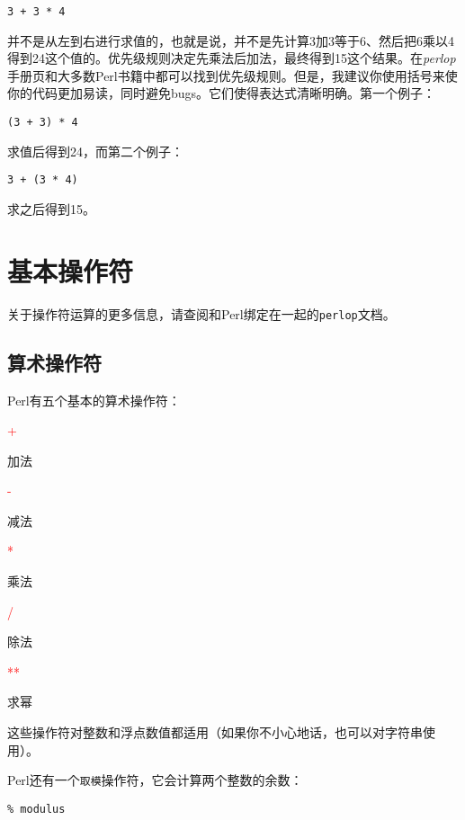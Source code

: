 \begin{lstlisting}
3 + 3 * 4
\end{lstlisting}

并不是从左到右进行求值的，也就是说，并不是先计算3加3等于6、然后把6乘以4得到24这个值的。优先级规则决定先乘法后加法，最终得到15这个结果。在\textit{perlop}手册页和大多数Perl书籍中都可以找到优先级规则。但是，我建议你使用括号来使你的代码更加易读，同时避免bugs。它们使得表达式清晰明确。第一个例子：

\begin{lstlisting}
(3 + 3) * 4
\end{lstlisting}

求值后得到24，而第二个例子：

\begin{lstlisting}
3 + (3 * 4)
\end{lstlisting}

求之后得到15。

\section{基本操作符}
关于操作符运算的更多信息，请查阅和Perl绑定在一起的\verb|perlop|文档。

\subsection{算术操作符}
Perl有五个基本的算术操作符：

\noindent
\textcolor{red}{+}
\begin{adjustwidth}{4em}{}
加法
\end{adjustwidth}
\textcolor{red}{-}
\begin{adjustwidth}{4em}{}
减法
\end{adjustwidth}
\textcolor{red}{*}
\begin{adjustwidth}{4em}{}
乘法
\end{adjustwidth}
\textcolor{red}{/}
\begin{adjustwidth}{4em}{}
除法
\end{adjustwidth}
\textcolor{red}{**}
\begin{adjustwidth}{4em}{}
求幂
\end{adjustwidth}

这些操作符对整数和浮点数值都适用（如果你不小心地话，也可以对字符串使用）。

Perl还有一个\verb|取模|操作符，它会计算两个整数的余数：

\begin{lstlisting}
% modulus
\end{lstlisting}

